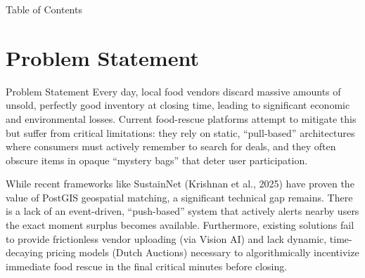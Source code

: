 \documentclass[aspectratio=169,xcolor=dvipsnames]{beamer}
\begin{document}

\begin{frame}{Table of Contents}
\tableofcontents
\end{frame}

\section{Problem Statement}
\begin{frame}{Problem Statement}
\justifying
Every day, local food vendors discard massive amounts of unsold, perfectly good inventory at closing time, leading to significant economic and environmental losses. Current food-rescue platforms attempt to mitigate this but suffer from critical limitations: they rely on static, ``pull-based'' architectures where consumers must actively remember to search for deals, and they often obscure items in opaque ``mystery bags'' that deter user participation. 

While recent frameworks like SustainNet (Krishnan et al., 2025) have proven the value of PostGIS geospatial matching, a significant technical gap remains. There is a lack of an event-driven, ``push-based'' system that actively alerts nearby users the exact moment surplus becomes available. Furthermore, existing solutions fail to provide frictionless vendor uploading (via Vision AI) and lack dynamic, time-decaying pricing models (Dutch Auctions) necessary to algorithmically incentivize immediate food rescue in the final critical minutes before closing.
\end{frame}


\end{document}
